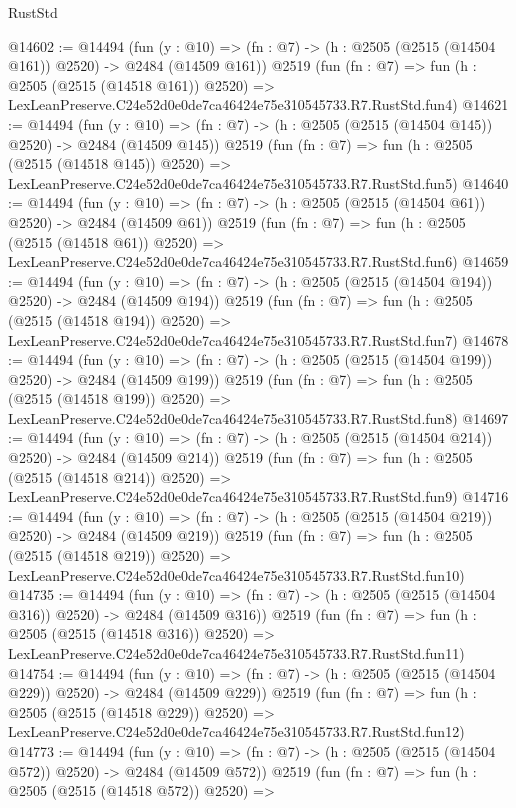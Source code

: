 \begin{lexlean}{RustStd}
\begin{coremodule}
@14602 := @14494
    (fun (y : @10) => (fn : @7) -> (h : @2505 (@2515 (@14504 @161)) @2520) -> @2484 (@14509 @161))
    @2519
    (fun (fn : @7) =>
    fun (h : @2505 (@2515 (@14518 @161)) @2520) =>
    LexLeanPreserve.C24e52d0e0de7ca46424e75e310545733.R7.RustStd.fun4)
@14621 := @14494
    (fun (y : @10) => (fn : @7) -> (h : @2505 (@2515 (@14504 @145)) @2520) -> @2484 (@14509 @145))
    @2519
    (fun (fn : @7) =>
    fun (h : @2505 (@2515 (@14518 @145)) @2520) =>
    LexLeanPreserve.C24e52d0e0de7ca46424e75e310545733.R7.RustStd.fun5)
@14640 := @14494
    (fun (y : @10) => (fn : @7) -> (h : @2505 (@2515 (@14504 @61)) @2520) -> @2484 (@14509 @61))
    @2519
    (fun (fn : @7) =>
    fun (h : @2505 (@2515 (@14518 @61)) @2520) =>
    LexLeanPreserve.C24e52d0e0de7ca46424e75e310545733.R7.RustStd.fun6)
@14659 := @14494
    (fun (y : @10) => (fn : @7) -> (h : @2505 (@2515 (@14504 @194)) @2520) -> @2484 (@14509 @194))
    @2519
    (fun (fn : @7) =>
    fun (h : @2505 (@2515 (@14518 @194)) @2520) =>
    LexLeanPreserve.C24e52d0e0de7ca46424e75e310545733.R7.RustStd.fun7)
@14678 := @14494
    (fun (y : @10) => (fn : @7) -> (h : @2505 (@2515 (@14504 @199)) @2520) -> @2484 (@14509 @199))
    @2519
    (fun (fn : @7) =>
    fun (h : @2505 (@2515 (@14518 @199)) @2520) =>
    LexLeanPreserve.C24e52d0e0de7ca46424e75e310545733.R7.RustStd.fun8)
@14697 := @14494
    (fun (y : @10) => (fn : @7) -> (h : @2505 (@2515 (@14504 @214)) @2520) -> @2484 (@14509 @214))
    @2519
    (fun (fn : @7) =>
    fun (h : @2505 (@2515 (@14518 @214)) @2520) =>
    LexLeanPreserve.C24e52d0e0de7ca46424e75e310545733.R7.RustStd.fun9)
@14716 := @14494
    (fun (y : @10) => (fn : @7) -> (h : @2505 (@2515 (@14504 @219)) @2520) -> @2484 (@14509 @219))
    @2519
    (fun (fn : @7) =>
    fun (h : @2505 (@2515 (@14518 @219)) @2520) =>
    LexLeanPreserve.C24e52d0e0de7ca46424e75e310545733.R7.RustStd.fun10)
@14735 := @14494
    (fun (y : @10) => (fn : @7) -> (h : @2505 (@2515 (@14504 @316)) @2520) -> @2484 (@14509 @316))
    @2519
    (fun (fn : @7) =>
    fun (h : @2505 (@2515 (@14518 @316)) @2520) =>
    LexLeanPreserve.C24e52d0e0de7ca46424e75e310545733.R7.RustStd.fun11)
@14754 := @14494
    (fun (y : @10) => (fn : @7) -> (h : @2505 (@2515 (@14504 @229)) @2520) -> @2484 (@14509 @229))
    @2519
    (fun (fn : @7) =>
    fun (h : @2505 (@2515 (@14518 @229)) @2520) =>
    LexLeanPreserve.C24e52d0e0de7ca46424e75e310545733.R7.RustStd.fun12)
@14773 := @14494
    (fun (y : @10) => (fn : @7) -> (h : @2505 (@2515 (@14504 @572)) @2520) -> @2484 (@14509 @572))
    @2519
    (fun (fn : @7) =>
    fun (h : @2505 (@2515 (@14518 @572)) @2520) =>

\end{coremodule}
\end{lexlean}
